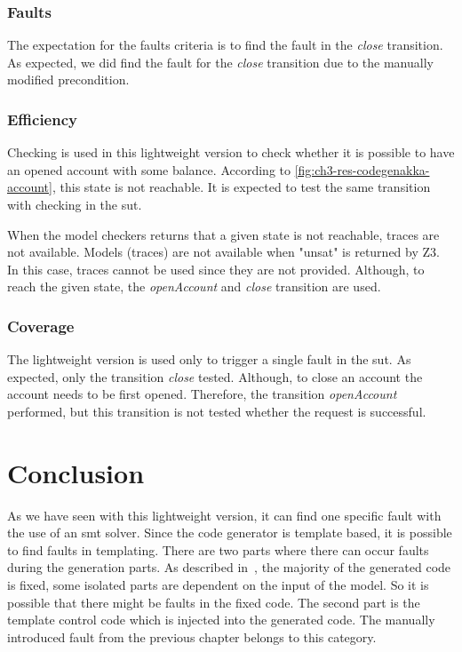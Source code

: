 \subsubsection{Faults}
The expectation for the faults criteria is to find the fault in the \textit{close} transition.
As expected, we did find the fault for the \textit{close}
transition due to the manually modified precondition.

\subsubsection{Efficiency}

Checking is used in this lightweight version to check whether it is possible
to have an opened account with some balance. According to
\autoref{fig:ch3-res-codegenakka-account}, this state is not reachable. It is
expected to test the same transition with checking in the \gls{sut}.

When the model checkers returns that a given state is not reachable,
traces are not available. Models (traces) are not available when "unsat" is
returned by Z3.
In this case, traces cannot be used since they are not provided. Although, to
reach the given state, the \textit{openAccount} and \textit{close} transition
are used.


\subsubsection{Coverage}
The lightweight version is used only to trigger a single fault in the \gls{sut}. As
expected, only the transition \textit{close} tested. Although, to close an
account the account needs to be first opened. Therefore, the transition
\textit{openAccount} performed, but this transition is not tested whether the
request is successful.

\section{Conclusion}

As we have seen with this lightweight version, it can find one specific fault with the use of an \gls{smt} solver. Since the code generator is template based, it is possible to find faults in templating. There are two parts where there can occur faults during the generation parts. As described in~\cite[p.~274]{voelter2013dsl}, the majority of the generated code is fixed, some isolated parts are dependent on the input of the model. So it is possible that there might be faults in the fixed code. The second part is the template control code which is injected into the generated code. The manually introduced fault from the previous chapter belongs  to this category.
